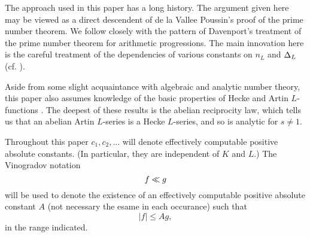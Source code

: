 \documentclass[./main]{subfiles}
\begin{document}
The approach used in this paper has a long history. The argument given here may be viewed as a direct descendent of de la Vallee Poussin's proof of the prime number theorem. We follow closely with the pattern of Davenport's treatment \cite{2-davenport2013multiplicative} of the prime number theorem for arithmetic progressions. The main innovation here is the careful treatment of the dependencies of various constants on $n_L$ and $\Delta_L$ (cf. \cite{2-davenport2013multiplicative, 4.1-Fogels1961, 5-goldstein1970, 8-lang1971, 10-Moreno}).

Aside from some slight acquaintance with algebraic and analytic number theory, this paper also assumes knowledge of the basic properties of Hecke and Artin $L$-functions \cite{6-Hilbronn1967}. The deepest of these results is the abelian reciprocity law, which tells us that an abelian Artin $L$-series is a Hecke $L$-series, and so is analytic for $s\ne 1$. 

Throughout this paper $c_1, c_2, \dots$ will denote effectively computable positive absolute constants. (In particular, they are independent of $K$ and $L$.) The Vinogradov notation
\[ f \ll g \]
will be used to denote the existence of an effectively computable positive absolute constant $A$ (not necessary the esame in each occurance) such that
\[ |f| \le Ag, \]
in the range indicated.
\end{document}
